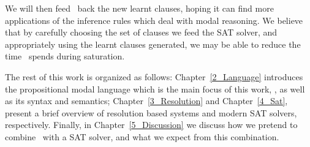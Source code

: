 We will then feed \ksp\ back the new learnt clauses, hoping it can find more
applications of the inference rules which deal with modal reasoning. We believe
that by carefully choosing the set of clauses we feed the SAT solver, and
appropriately using the learnt clauses generated, we may be able to reduce the
time \ksp~spends during saturation. 

The rest of this work is organized as follows: Chapter~\ref{2_Language}
introduces the propositional modal language which is the main focus of this
work, , as well as its syntax and semantics;
Chapter~\ref{3_Resolution} and Chapter~\ref{4_Sat}, present a brief overview of
resolution based systems and modern SAT solvers, respectively. Finally, in
Chapter~\ref{5_Discussion} we discuss how we pretend to combine \ksp\ with a SAT
solver, and what we expect from this combination.
